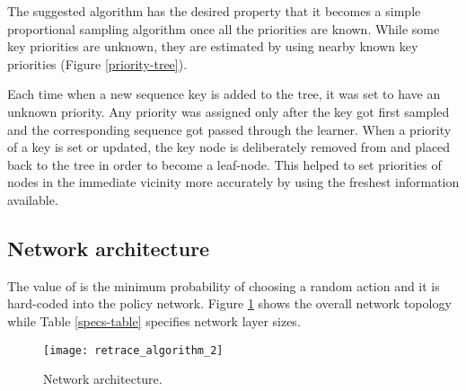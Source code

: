 \documentclass{article}
\begin{document}
The suggested algorithm has the desired property that it becomes a simple 
proportional sampling algorithm once all the priorities are known. While 
some key priorities are unknown, they are estimated by using nearby known 
key priorities (Figure \ref{priority-tree}).

Each time when a new sequence key is added to the tree, it was set to have an 
unknown priority. Any priority was assigned only after the key got first 
sampled and the corresponding sequence got passed through the learner. When a 
priority of a key is set or updated, the key node is deliberately removed from 
and placed back to the tree in order to become a leaf-node. This helped to 
set priorities of nodes in the immediate vicinity more accurately by using the 
freshest information available.


\subsection{Network architecture}
The value of 
 is the minimum probability of choosing a random action and it 
is hard-coded into the policy network. Figure \ref{netarch} shows the overall 
network topology while Table \ref{specs-table} specifies network layer sizes.
\newpage
\begin{figure}[ht]
\centering
\texttt{[image: retrace\_algorithm\_2]}
  \caption{Network architecture.}
  \label{netarch}
\end{figure}
\end{document}
